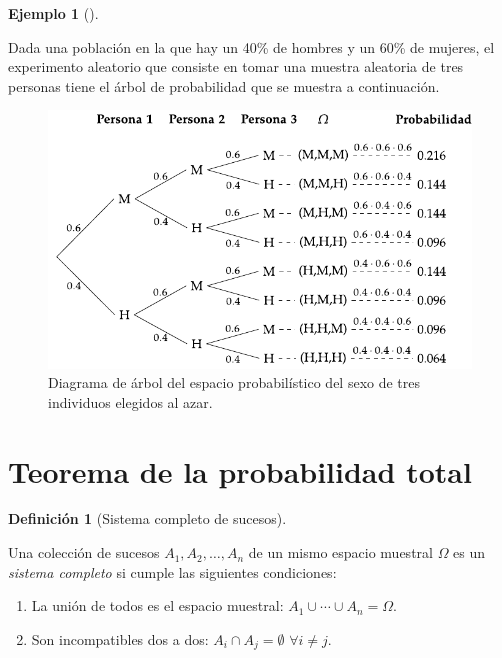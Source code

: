 \documentclass[
  a4paper,
]{scrreport}
\theoremstyle{plain}
\theoremstyle{definition}
\newtheorem{definition}{Definición}[chapter]
\theoremstyle{definition}
\newtheorem{example}{Ejemplo}[chapter]
\theoremstyle{remark}
\begin{document}
\begin{example}[]\protect\hypertarget{exm-arbol-probabilidad-variables-independientes-2}{}\label{exm-arbol-probabilidad-variables-independientes-2}

Dada una población en la que hay un 40\% de hombres y un 60\% de
mujeres, el experimento aleatorio que consiste en tomar una muestra
aleatoria de tres personas tiene el árbol de probabilidad que se muestra
a continuación.

\begin{figure}[H]

{\centering \includegraphics{img/probabilidad/espacio_probabilistico_muestra.pdf}

}

\caption{Diagrama de árbol del espacio probabilístico del sexo de tres
individuos elegidos al azar.}

\end{figure}%

\end{example}

\section{Teorema de la probabilidad
total}\label{teorema-de-la-probabilidad-total}

\begin{definition}[Sistema completo de
sucesos]\protect\hypertarget{def-sistema-completo-sucesos}{}\label{def-sistema-completo-sucesos}

Una colección de sucesos \(A_1,A_2,\ldots,A_n\) de un mismo espacio
muestral \(\Omega\) es un \emph{sistema completo} si cumple las
siguientes condiciones:

\begin{enumerate}
\def\labelenumi{\arabic{enumi}.}
\item
  La unión de todos es el espacio muestral:
  \(A_1\cup \cdots\cup A_n =\Omega\).
\item
  Son incompatibles dos a dos: \(A_i\cap A_j = \emptyset\)
  \(\forall i\neq j\).
\end{enumerate}

\end{definition}
\end{document}
